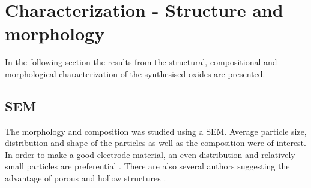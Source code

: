 \documentclass[Main/main.tex]{subfiles}
\begin{document}
\begin{table}[ht]
	\caption{The recorded masses of the as-deposited oxides. There is an increase in the weight going from LMO to LNMO at low concentration and a further clear increase going to higher concentration. }
	\label{fig:mass}
\end{table}


\section[Characterization]{Characterization - Structure and morphology}
In the following section the results from the structural, compositional and morphological characterization of the synthesised oxides are presented. 

\subsection{SEM}
The morphology and composition was studied using a SEM. Average particle size, distribution and shape of the particles as well as the composition were of interest. In order to make a good electrode material, an even distribution and relatively small particles are preferential \cite{elmat_sprayp}. There are also several authors suggesting the advantage of porous and hollow structures \cite{elmat_sprayp,1_amorph_MnO2}.

\subsubsection{}
\end{document}
